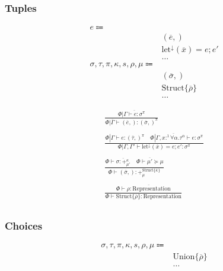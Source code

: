 \documentclass {article}
\begin{document}
\subsubsection{Tuples}
\begin{align*}
e \Coloneqq & \\
& (\overline e,) \tag{Tuple Introduction} \\
& \text{let}^\downarrow (\overline x) = e; e' \tag{Tuple Elimination} \\
& \dots \\
\sigma, \tau, \pi, \kappa, s, \rho, \mu \Coloneqq & \\
& (\overline \sigma,) \tag{Tuple} \\
& \text{Struct} \{ \overline \rho \} \tag{Struct Representation} \\
& \dots
\end{align*}

\begin{gather*}
\frac
{\Phi | \overline { \Gamma \vdash e : \sigma^\pi }}
{\Phi | \overline \Gamma  \vdash (\overline e,) : (\overline \sigma,)^\pi } \\
\\
\frac
{\Phi | \Gamma \vdash e : (\overline \tau,)^\pi \quad \Phi | \Gamma , \overline {x :^1 \forall \alpha. \tau^\alpha} \vdash e : \sigma^\pi}
{\Phi | \Gamma, \Gamma' \vdash \text{let}^\downarrow (\overline x) = e; e' : \sigma^\pi} \\
\\
\frac
{\Phi \vdash \overline {\sigma : +^{\kappa}_{\mu'}} \quad \Phi \vdash \overline {\mu'} \succeq \mu }
{\Phi \vdash (\overline \sigma,) : +^{\text{Struct} \{ \overline \kappa\}}_\mu} \\
\\
\frac
{\Phi \vdash \overline {\rho : \text{Representation}}}
{\Phi \vdash \text{Struct} \{ \overline \rho \} : \text{Representation} } \\
\end{gather*}

\subsubsection{Choices}
\begin{align*}
\sigma, \tau, \pi, \kappa, s, \rho, \mu \Coloneqq & \\
& \text{Union} \{ \overline \rho \} \tag{Union Representation} \\
& \dots
\end{align*}
\end{document}

